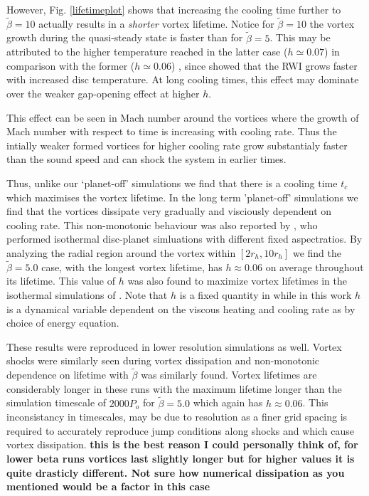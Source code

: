However, Fig. \ref{lifetimeplot} shows that increasing the cooling
time further to $\tilde{\beta}=10$ actually results in a
\emph{shorter} vortex lifetime. Notice for $\tilde{\beta}=10$ the vortex growth 
during the quasi-steady state is faster than for
$\tilde{\beta}=5$.
 This may be attributed to the higher temperature
reached in the latter case ($h\simeq 0.07$) in comparison with the former
($h\simeq 0.06$)
, since \cite{li00} showed that the RWI grows
faster with increased disc temperature. At long cooling times, this
effect may dominate over the weaker gap-opening effect at higher $h$.   

This effect can be seen in Mach number around the vortices where the
growth of Mach number with respect to time is increasing with cooling rate.
Thus the intially weaker formed vortices for higher cooling rate grow
substantialy faster than the sound speed and can shock the system in earlier
times.

Thus, unlike our `planet-off' simulations we find that there is
a cooling time $t_c$ which maximises the vortex lifetime. In the long term
 'planet-off' simulations we find that the vortices dissipate very gradually
 and visciously dependent on cooling rate.
This
non-monotonic behaviour was also reported by \cite{fu14}, who
performed isothermal disc-planet simluations with different fixed
aspectratios.   
By analyzing the radial region around the vortex within
 $[2r_{h},10r_{h}]$
 we find the
$\tilde\beta=5.0$ case, with the longest vortex lifetime, has
$h\approx0.06$ on average throughout its lifetime. This value of $h$ was also
 found to maximize vortex
lifetimes in the isothermal simulations of \cite{fu14}. Note that $h$ is a fixed
quantity in \cite{fu14} while in this work $h$ is a dynamical variable dependent
 on the viscous heating and cooling rate as by choice of energy equation.

These results were reproduced in lower resolution simulations as well. Vortex
shocks were similarly seen during vortex dissipation and non-monotonic
 dependence on lifetime with $\tilde\beta$ was similarly found.
Vortex lifetimes are considerably longer in these runs with the maximum
 lifetime longer than the simulation timescale of $2000P_o$ for 
$\tilde\beta=5.0$ which again has $h\approx0.06$.
This inconsistancy in timescales, may be due to resolution as a finer 
grid spacing is required to accurately
reproduce jump conditions along shocks and which cause vortex dissipation.
 {\bf this is the best reason I could personally think of, for lower beta runs vortices last slightly longer but for higher values it is quite drasticly different. Not sure how numerical dissipation as you mentioned would be a factor in this case}


